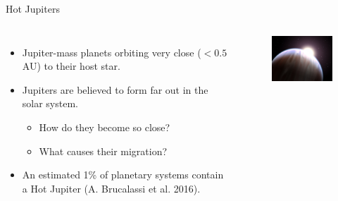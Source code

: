 \documentclass{beamer}
\begin{document}
\begin{frame}{Hot Jupiters}
    \begin{columns}
            \begin{itemize}
                \item Jupiter-mass planets orbiting very close ($<0.5$ AU) to their host star.
                \item Jupiters are believed to form far out in the solar system.
                    \begin{itemize}
                        \item How do they become so close?
                        \item What causes their migration?
                    \end{itemize}
                \item An estimated 1\% of planetary systems contain a 
                    Hot Jupiter (A. Brucalassi et al. 2016)\footnotemark.
            \end{itemize}
            \begin{figure}
                \centering
                \includegraphics[width=1.66in]{large_hj}
            \end{figure}
    \end{columns}


\end{frame}
\end{document}
